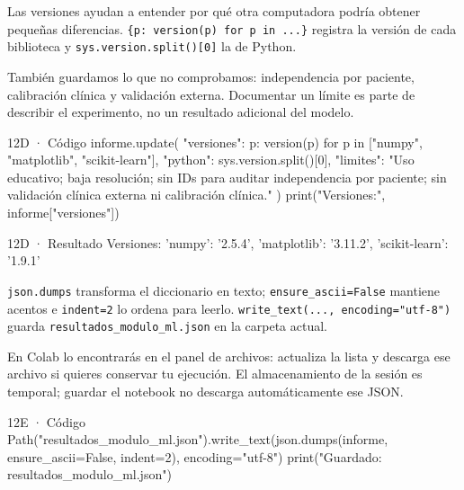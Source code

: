 Las versiones ayudan a entender por qué otra computadora podría obtener pequeñas diferencias. \texttt{\small \{p:\allowbreak{} version(\allowbreak{}p)\allowbreak{} for p in .\allowbreak{}.\allowbreak{}.\allowbreak{}\}} registra la versión de cada biblioteca y \texttt{\small sys.\allowbreak{}version.\allowbreak{}split(\allowbreak{})\allowbreak{}[\allowbreak{}0]\allowbreak{}} la de Python.

También guardamos lo que no comprobamos: independencia por paciente, calibración clínica y validación externa. Documentar un límite es parte de describir el experimento, no un resultado adicional del modelo.


\begin{Codigo}{12D · Código}
informe.update({
    "versiones": {p: version(p) for p in ["numpy", "matplotlib", "scikit-learn"]},
    "python": sys.version.split()[0],
    "limites": "Uso educativo; baja resolución; sin IDs para auditar independencia por paciente; sin validación clínica externa ni calibración clínica."
})
print("Versiones:", informe["versiones"])
\end{Codigo}

\begin{Salida}{12D · Resultado}
Versiones: {'numpy': '2.5.4', 'matplotlib': '3.11.2', 'scikit-learn': '1.9.1'}
\end{Salida}

\label{paso-12e}

\texttt{\small json.\allowbreak{}dumps} transforma el diccionario en texto; \texttt{\small ensure\_\allowbreak{}ascii=\allowbreak{}False} mantiene acentos e \texttt{\small indent=\allowbreak{}2} lo ordena para leerlo. \texttt{\small write\_\allowbreak{}text(\allowbreak{}.\allowbreak{}.\allowbreak{}.\allowbreak{},\allowbreak{} encoding=\allowbreak{}"utf-8")\allowbreak{}} guarda \texttt{\small resultados\_\allowbreak{}modulo\_\allowbreak{}ml.\allowbreak{}json} en la carpeta actual.

En Colab lo encontrarás en el panel de archivos: actualiza la lista y descarga ese archivo si quieres conservar tu ejecución. El almacenamiento de la sesión es temporal; guardar el notebook no descarga automáticamente ese JSON.


\begin{Codigo}{12E · Código}
Path("resultados_modulo_ml.json").write_text(json.dumps(informe, ensure_ascii=False, indent=2), encoding="utf-8")
print("Guardado: resultados_modulo_ml.json")
\end{Codigo}

